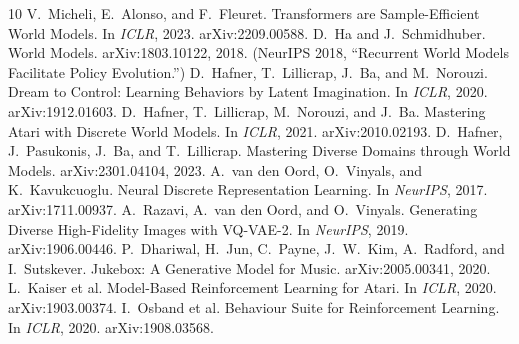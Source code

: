 \documentclass[11pt]{article}
\begin{document}
\begin{thebibliography}{10}
 V.~Micheli, E.~Alonso, and F.~Fleuret.
  Transformers are Sample-Efficient World Models.
  In \emph{ICLR}, 2023. arXiv:2209.00588.
 D.~Ha and J.~Schmidhuber.
  World Models. arXiv:1803.10122, 2018. (NeurIPS 2018, ``Recurrent World Models
  Facilitate Policy Evolution.'')
 D.~Hafner, T.~Lillicrap, J.~Ba, and M.~Norouzi.
  Dream to Control: Learning Behaviors by Latent Imagination.
  In \emph{ICLR}, 2020. arXiv:1912.01603.
 D.~Hafner, T.~Lillicrap, M.~Norouzi, and J.~Ba.
  Mastering Atari with Discrete World Models.
  In \emph{ICLR}, 2021. arXiv:2010.02193.
 D.~Hafner, J.~Pasukonis, J.~Ba, and T.~Lillicrap.
  Mastering Diverse Domains through World Models. arXiv:2301.04104, 2023.
 A.~van den Oord, O.~Vinyals, and K.~Kavukcuoglu.
  Neural Discrete Representation Learning. In \emph{NeurIPS}, 2017.
  arXiv:1711.00937.
 A.~Razavi, A.~van den Oord, and O.~Vinyals.
  Generating Diverse High-Fidelity Images with VQ-VAE-2.
  In \emph{NeurIPS}, 2019. arXiv:1906.00446.
 P.~Dhariwal, H.~Jun, C.~Payne, J.~W.~Kim, A.~Radford, and
  I.~Sutskever. Jukebox: A Generative Model for Music. arXiv:2005.00341, 2020.
 L.~Kaiser et al.
  Model-Based Reinforcement Learning for Atari. In \emph{ICLR}, 2020.
  arXiv:1903.00374.
 I.~Osband et al.
  Behaviour Suite for Reinforcement Learning. In \emph{ICLR}, 2020.
  arXiv:1908.03568.
\end{thebibliography}
\end{document}
